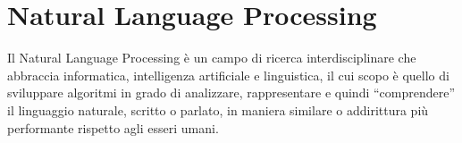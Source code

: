 \section{Natural Language Processing}
Il Natural Language Processing è un campo di ricerca interdisciplinare che abbraccia informatica, intelligenza artificiale e linguistica, il cui scopo è quello di sviluppare algoritmi in grado di analizzare, rappresentare e quindi “comprendere” il linguaggio naturale, scritto o parlato, in maniera similare o addirittura più performante rispetto agli esseri umani. 


